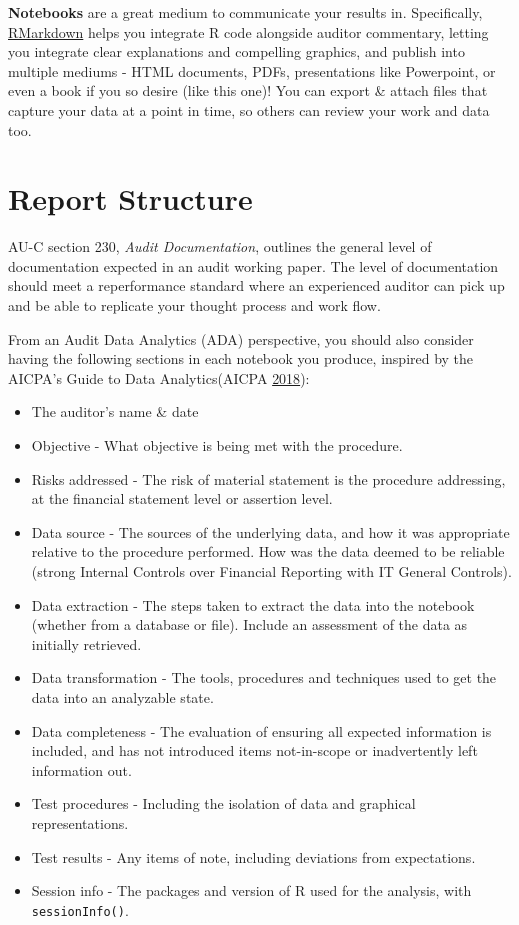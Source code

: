 \documentclass[
]{book}
\providecommand{\tightlist}{%
  \setlength{\itemsep}{0pt}\setlength{\parskip}{0pt}}
\begin{document}
\textbf{Notebooks} are a great medium to communicate your results in. Specifically, \href{https://rmarkdown.rstudio.com}{RMarkdown} helps you integrate R code alongside auditor commentary, letting you integrate clear explanations and compelling graphics, and publish into multiple mediums - HTML documents, PDFs, presentations like Powerpoint, or even a book if you so desire (like this one)! You can export \& attach files that capture your data at a point in time, so others can review your work and data too.

\hypertarget{report-structure}{%
\section{Report Structure}\label{report-structure}}

AU-C section 230, \emph{Audit Documentation}, outlines the general level of documentation expected in an audit working paper. The level of documentation should meet a reperformance standard where an experienced auditor can pick up and be able to replicate your thought process and work flow.

From an Audit Data Analytics (ADA) perspective, you should also consider having the following sections in each notebook you produce, inspired by the AICPA's Guide to Data Analytics(AICPA \protect\hyperlink{ref-aicpa2018guide}{2018}):

\begin{itemize}
\tightlist
\item
  The auditor's name \& date
\item
  Objective - What objective is being met with the procedure.
\item
  Risks addressed - The risk of material statement is the procedure addressing, at the financial statement level or assertion level.
\item
  Data source - The sources of the underlying data, and how it was appropriate relative to the procedure performed. How was the data deemed to be reliable (strong Internal Controls over Financial Reporting with IT General Controls).
\item
  Data extraction - The steps taken to extract the data into the notebook (whether from a database or file). Include an assessment of the data as initially retrieved.
\item
  Data transformation - The tools, procedures and techniques used to get the data into an analyzable state.
\item
  Data completeness - The evaluation of ensuring all expected information is included, and has not introduced items not-in-scope or inadvertently left information out.
\item
  Test procedures - Including the isolation of data and graphical representations.
\item
  Test results - Any items of note, including deviations from expectations.
\item
  Session info - The packages and version of R used for the analysis, with \texttt{sessionInfo()}.
\end{itemize}
\end{document}

